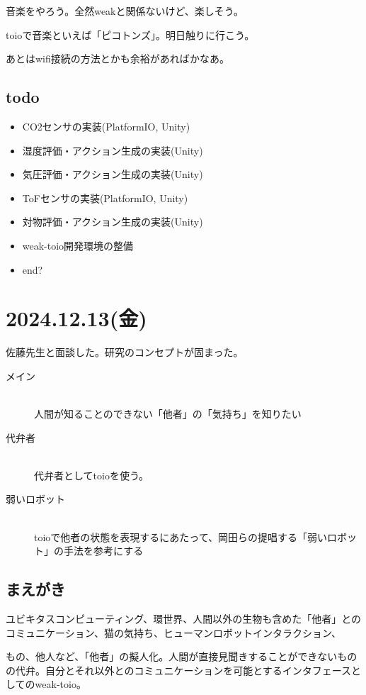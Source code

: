 \documentclass[fleqn,twocolumn]{mynote}
\begin{document}
  音楽をやろう。全然weakと関係ないけど、楽しそう。

  toioで音楽といえば「ピコトンズ」。明日触りに行こう。

  あとはwifi接続の方法とかも余裕があればかなあ。

  \subsection*{todo}
  \begin{itemize}
    \item CO2センサの実装(PlatformIO, Unity)
    \item 湿度評価・アクション生成の実装(Unity)
    \item 気圧評価・アクション生成の実装(Unity)
    \item ToFセンサの実装(PlatformIO, Unity)
    \item 対物評価・アクション生成の実装(Unity)
    \item weak-toio開発環境の整備
    \item end?
  \end{itemize}

  \section*{2024.12.13(金)}
  佐藤先生と面談した。研究のコンセプトが固まった。

  \begin{description}
    \item[メイン]\mbox{}\\
      人間が知ることのできない「他者」の「気持ち」を知りたい
    \item[代弁者]\mbox{}\\
      代弁者としてtoioを使う。
    \item[弱いロボット]\mbox{}\\
      toioで他者の状態を表現するにあたって、岡田らの提唱する「弱いロボット」の手法を参考にする
  \end{description}

  \subsection*{まえがき}
  ユビキタスコンピューティング、環世界、人間以外の生物も含めた「他者」とのコミュニケーション、猫の気持ち、ヒューマンロボットインタラクション、

  もの、他人など、「他者」の擬人化。人間が直接見聞きすることができないものの代弁。自分とそれ以外とのコミュニケーションを可能とするインタフェースとしてのweak-toio。
\end{document}
